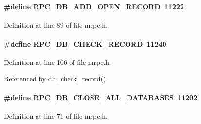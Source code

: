 \paragraph[{RPC\_\-DB\_\-ADD\_\-OPEN\_\-RECORD}]{\setlength{\rightskip}{0pt plus 5cm}\#define RPC\_\-DB\_\-ADD\_\-OPEN\_\-RECORD~11222}\hfill\label{group__mrpcdefineh_ga009689a06b30a501cff2aafefb18287a}

\begin{DoxyItemize}
\item 
\end{DoxyItemize}

Definition at line 89 of file mrpc.h.
\paragraph[{RPC\_\-DB\_\-CHECK\_\-RECORD}]{\setlength{\rightskip}{0pt plus 5cm}\#define RPC\_\-DB\_\-CHECK\_\-RECORD~11240}\hfill\label{group__mrpcdefineh_gab25336d988315c6922306ee2994c6991}

\begin{DoxyItemize}
\item 
\end{DoxyItemize}

Definition at line 106 of file mrpc.h.

Referenced by db\_\-check\_\-record().
\paragraph[{RPC\_\-DB\_\-CLOSE\_\-ALL\_\-DATABASES}]{\setlength{\rightskip}{0pt plus 5cm}\#define RPC\_\-DB\_\-CLOSE\_\-ALL\_\-DATABASES~11202}\hfill\label{group__mrpcdefineh_ga677c4b59869a9d9f143a494798a8d9cb}

\begin{DoxyItemize}
\item 
\end{DoxyItemize}

Definition at line 71 of file mrpc.h.

